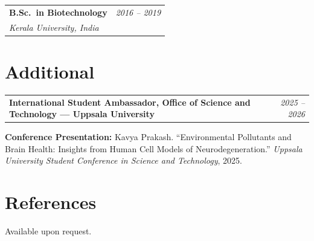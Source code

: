 \documentclass[10pt, a4paper]{article}
\makeatletter
\newcommand{\entry}[3]{%
  \begin{tabularx}{\linewidth}{@{}X r@{}}
    \textbf{#1} & \textit{#3} \\
    \textit{#2} & \\
  \end{tabularx}%
}
\newcommand{\entryflat}[2]{%
  \begin{tabularx}{\linewidth}{@{}X r@{}}
    \textbf{#1} & \textit{#2} \\
  \end{tabularx}%
}
\makeatother
\begin{document}
\vspace{4pt}

\entry{B.Sc.\ in Biotechnology}{Kerala University, India}{2016 -- 2019}

\vspace{2pt}

\section{Additional}

\entryflat{International Student Ambassador, Office of Science and Technology --- Uppsala University}{2025 -- 2026}

\vspace{4pt}

\textbf{Conference Presentation:} Kavya Prakash. ``Environmental Pollutants and Brain Health:
Insights from Human Cell Models of Neurodegeneration.''
\textit{Uppsala University Student Conference in Science and Technology}, 2025.

\vspace{2pt}

\section{References}

Available upon request.

\end{document}

